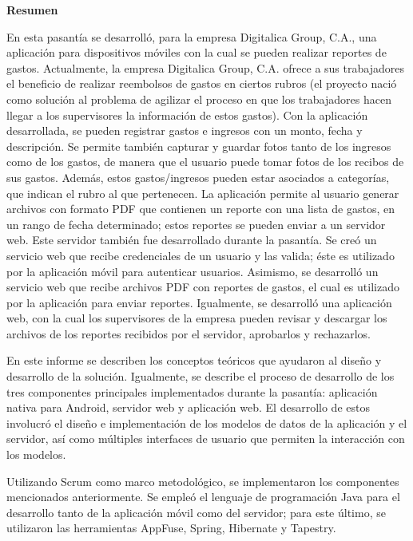 \setcounter{page}{3}
\begin{center}
	{\bf Resumen}  %
\end{center}	

En esta pasantía se desarrolló, para la empresa Digitalica Group, C.A., una aplicación para dispositivos móviles con la cual se pueden realizar reportes de gastos. Actualmente, la empresa Digitalica Group, C.A. ofrece a sus trabajadores el beneficio de realizar reembolsos de gastos en ciertos rubros (el proyecto nació como solución al problema de agilizar el proceso en que los trabajadores hacen llegar a los supervisores la información de estos gastos). Con la aplicación desarrollada, se pueden registrar gastos e ingresos con un monto, fecha y descripción. Se permite también capturar y guardar fotos tanto de los ingresos como de los gastos, de manera que el usuario puede tomar fotos de los recibos de sus gastos. Además, estos gastos/ingresos pueden estar asociados a categorías, que indican el rubro al que pertenecen. La aplicación permite al usuario generar archivos con formato PDF que contienen un reporte con una lista de gastos, en un rango de fecha determinado; estos reportes se pueden enviar a un servidor web. Este servidor también fue desarrollado durante la pasantía. Se creó un servicio web que recibe credenciales de un usuario y las valida; éste es utilizado por la aplicación móvil para autenticar usuarios. Asimismo, se desarrolló un servicio web que recibe archivos PDF con reportes de gastos, el cual es utilizado por la aplicación para enviar reportes. Igualmente, se desarrolló una aplicación web, con la cual los supervisores de la empresa pueden revisar y descargar los archivos de los reportes recibidos por el servidor, aprobarlos y rechazarlos.

En este informe se describen los conceptos teóricos que ayudaron al diseño y desarrollo de la solución. Igualmente, se describe el proceso de desarrollo de los tres componentes principales implementados durante la pasantía: aplicación nativa para Android, servidor web y aplicación web. El desarrollo de estos involucró el diseño e implementación de los modelos de datos de la aplicación y el servidor, así como múltiples interfaces de usuario que permiten la interacción con los modelos. 

Utilizando Scrum como marco metodológico, se implementaron los componentes mencionados anteriormente. Se empleó el lenguaje de programación Java para el desarrollo tanto de la aplicación móvil como del servidor; para este último, se utilizaron las herramientas AppFuse, Spring, Hibernate y Tapestry.


